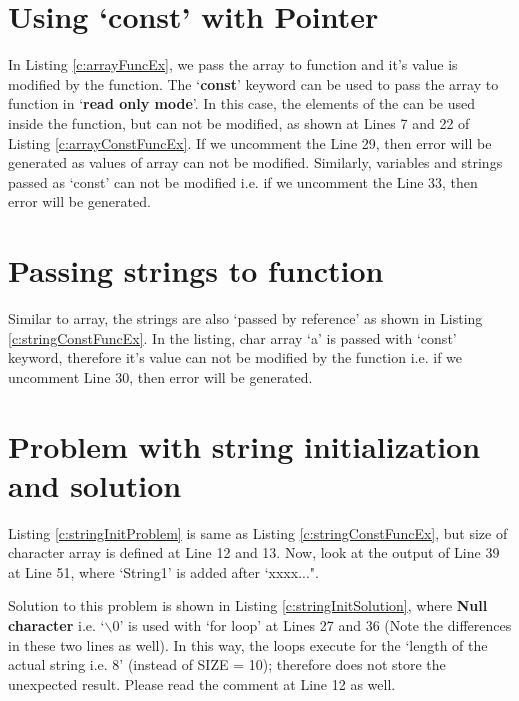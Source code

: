 
\section{Using `const' with Pointer}
In Listing \ref{c:arrayFuncEx}, we pass the array to function and it's value is modified by the function. The `\textbf{const}' keyword can be used to pass the array to function in `\textbf{read only mode}'. In this case, the elements of the can be used inside the function, but can not be modified, as shown at Lines 7 and 22 of Listing \ref{c:arrayConstFuncEx}. If we uncomment the Line 29, then error will be generated as values of array can not be modified. Similarly, variables and strings passed as `const' can not be modified i.e. if we uncomment the Line 33, then error will be generated. 



\section{Passing strings to function}
Similar to array, the strings are also `passed by reference' as shown in Listing \ref{c:stringConstFuncEx}. In the listing, char array `a' is passed with `const' keyword, therefore it's value can not be modified by the function i.e. if we uncomment Line 30, then error will be generated.  



\section{Problem with string initialization and solution}
Listing \ref{c:stringInitProblem} is same as Listing \ref{c:stringConstFuncEx}, but size of character array is defined at Line 12 and 13. Now, look at the output of Line 39 at Line 51, where `String1' is added after `xxxx...".
\begin{noNumBox}
	 Solution to this problem is shown in Listing \ref{c:stringInitSolution}, where \textbf{Null character} i.e. `$\backslash 0$' is used with `for loop' at Lines 27 and 36 (Note the differences in these two lines as well).  In this way, the loops execute for the `length of the actual string i.e. 8' (instead of SIZE = 10); therefore does not store the unexpected result.  Please read the comment at Line 12 as well. 
\end{noNumBox}

